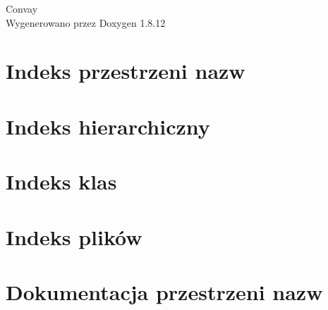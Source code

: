 \documentclass[twoside]{book}
\newcommand{\+}{\discretionary{\mbox{\scriptsize$\hookleftarrow$}}{}{}}
\newcommand{\clearemptydoublepage}{%
  \newpage{\pagestyle{empty}\cleardoublepage}%
}
\begin{document}
\hypersetup{pageanchor=false,
             bookmarksnumbered=true,
             pdfencoding=unicode
            }
\begin{titlepage}
\vspace*{7cm}
\begin{center}%
{\Large Convay }\\
\vspace*{1cm}
{\large Wygenerowano przez Doxygen 1.8.12}\\
\end{center}
\end{titlepage}
\clearemptydoublepage
{}
\tableofcontents
\clearemptydoublepage
{}
\hypersetup{pageanchor=true}

\chapter{Indeks przestrzeni nazw}

\chapter{Indeks hierarchiczny}

\chapter{Indeks klas}

\chapter{Indeks plików}

\chapter{Dokumentacja przestrzeni nazw}







\end{document}
